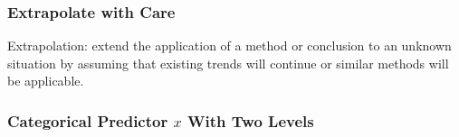 \documentclass[handout]{beamer}
\newcommand{\blue}[1]{\textcolor{blue2}{#1}}
\begin{document}
\begin{frame}[fragile]
\frametitle{Extrapolate with Care}
\blue{Extrapolation}:  extend the application of a method or conclusion to an unknown situation by assuming that existing trends will continue or similar methods will be applicable.

%
%
%

\end{frame}


\begin{frame}[fragile]
\frametitle{Categorical Predictor $x$ With Two Levels}

%
%
%

\end{frame}
\end{document}
